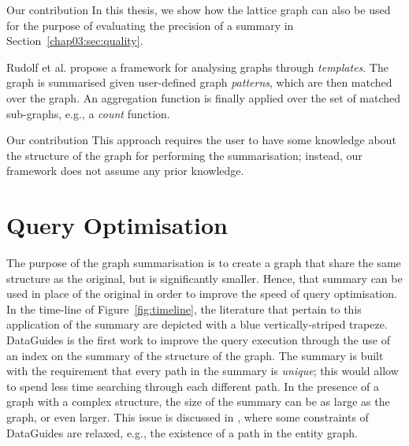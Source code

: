 \begin{centeremph}{Our contribution}
	In this thesis, we show how the \gls{lattice} graph can also be used for the purpose of evaluating the precision of a summary in Section~\ref{chap03:sec:quality}.
\end{centeremph}

Rudolf et al. \cite{rudolf:2013:slg} propose a framework for analysing graphs through \emph{templates}. The graph is summarised given user-defined graph \emph{patterns}, which are then matched over the graph. An aggregation function is finally applied over the set of matched sub-graphs, e.g., a \emph{count} function.

\begin{centeremph}{Our contribution}
	This approach requires the user to have some knowledge about the structure of the graph for performing the summarisation; instead, our framework does not assume any prior knowledge.
\end{centeremph}

\section{Query Optimisation}
\label{chap03:review:query-optim}

The purpose of the graph summarisation is to create a graph that share the same structure as the original, but is significantly smaller. Hence, that summary can be used in place of the original in order to improve the speed of query optimisation. In the time-line of Figure~\ref{fig:timeline}, the literature that pertain to this application of the summary are depicted with a blue vertically-striped trapeze.\\

DataGuides \cite{goldman1997dataguides} is the first work to improve the query execution through the use of an index on the summary of the structure of the graph. The summary is built with the requirement that every path in the summary is \emph{unique}; this would allow to spend less time searching through each different path. In the presence of a graph with a complex structure, the size of the summary can be as large as the graph, or even larger. This issue is discussed in \cite{goldman1999approximate}, where some constraints of DataGuides are relaxed, e.g., the existence of a path in the entity graph.\\

